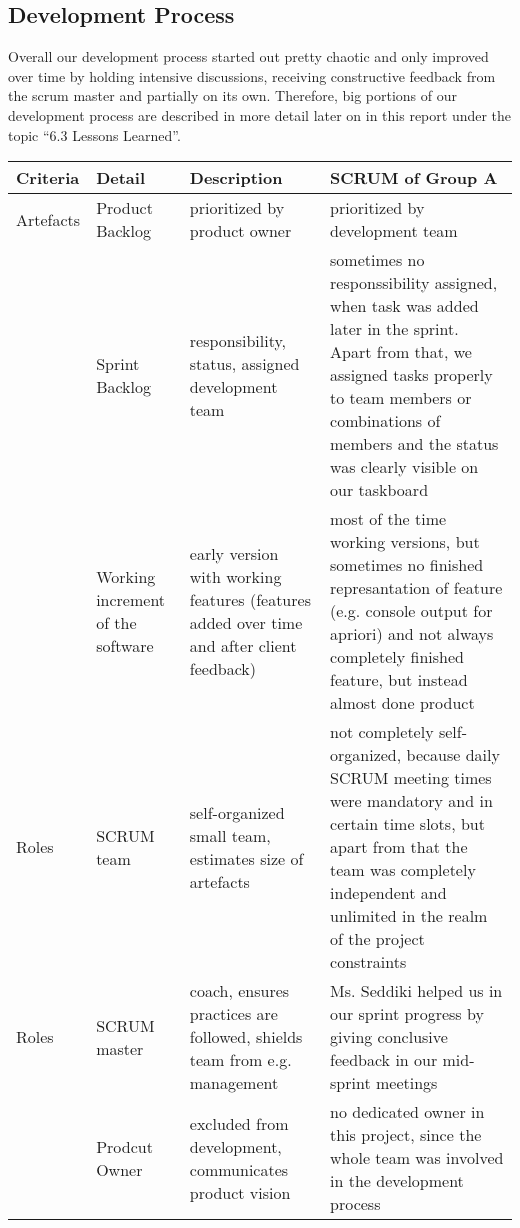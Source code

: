 
\subsection{Development Process}

Overall our development process started out pretty chaotic and only improved over time by holding intensive discussions, receiving constructive feedback from the scrum master and partially on its own. Therefore, big portions of our development process are described in more detail later on in this report under the topic “6.3 Lessons Learned”.

\begin{longtable}{|p{}|p{}|p{}|p{}|}
\hline
    Criteria & Detail & Description & SCRUM of Group A\\
    \hline
    \hline
    Artefacts & Product Backlog & prioritized by product owner & prioritized by development team \\\cline{2-4}
      & Sprint Backlog & responsibility, status, assigned development team & sometimes no responssibility assigned, when task was added later in the sprint. Apart from that, we assigned tasks properly to team members or combinations of members and the status was clearly visible on our taskboard\\\cline{2-4}
      & Working increment of the software & early version with working features (features added over time and after client feedback) & most of the time working versions, but sometimes no finished represantation of feature (e.g. console output for apriori) and not always completely finished feature, but instead almost done product \\
    \hline
    Roles & SCRUM team & self-organized small team, estimates size of artefacts & not completely self-organized, because daily SCRUM meeting times were mandatory and in certain time slots, but apart from that the team was completely independent and unlimited in the realm of the project constraints \\\hline 
     Roles & SCRUM master & coach, ensures practices are followed, shields team from e.g. management & Ms. Seddiki helped us in our sprint progress by giving conclusive feedback in our mid-sprint meetings \\\cline{2-4}
       & Prodcut Owner & excluded from development, communicates product vision & no dedicated owner in this project, since the whole team was involved in the development process \\

\end{longtable}
